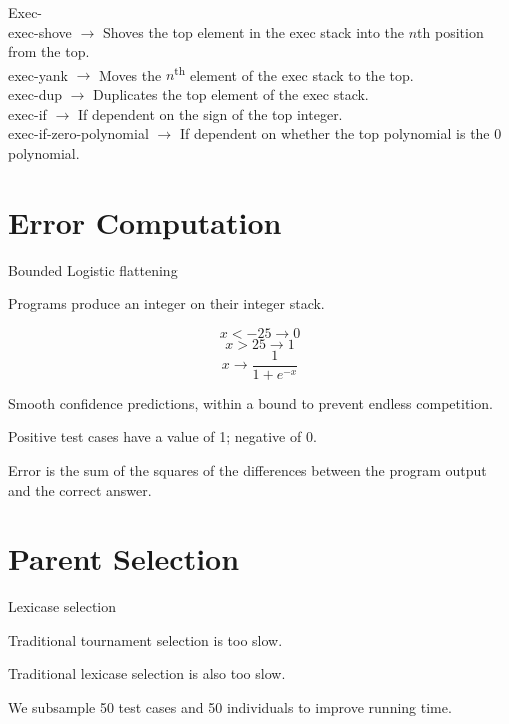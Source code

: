 \documentclass[20pt]{extarticle}
\begin{document}
\noindent Exec- \\
\indent exec-shove $\rightarrow$ Shoves the top element in the exec stack into the $n$th position from the top. \\
\indent exec-yank $\rightarrow$ Moves the $n$\textsuperscript{th} element of the exec stack to the top. \\
\indent exec-dup $\rightarrow$ Duplicates the top element of the exec stack. \\
\indent exec-if $\rightarrow$ If dependent on the sign of the top integer. \\
\indent exec-if-zero-polynomial $\rightarrow$ If dependent on whether the top polynomial is the 0 polynomial. \\

\newpage
\section*{Error Computation}

\noindent Bounded Logistic flattening

\noindent Programs produce an integer on their integer stack. 

 $$x < -25 \rightarrow 0 $$
 $$x > 25  \rightarrow 1 $$
 $$x \rightarrow \frac{1}{1+e^{-x}}$$

\noindent Smooth confidence predictions, within a bound to prevent endless competition. 

\noindent Positive test cases have a value of 1; negative of 0.

\noindent Error is the sum of the squares of the differences between the program output and the correct answer.


\newpage
\section*{Parent Selection}

Lexicase selection

Traditional tournament selection is too slow.

Traditional lexicase selection is also too slow. 

We subsample 50 test cases and 50 individuals to improve running time.
\end{document}
